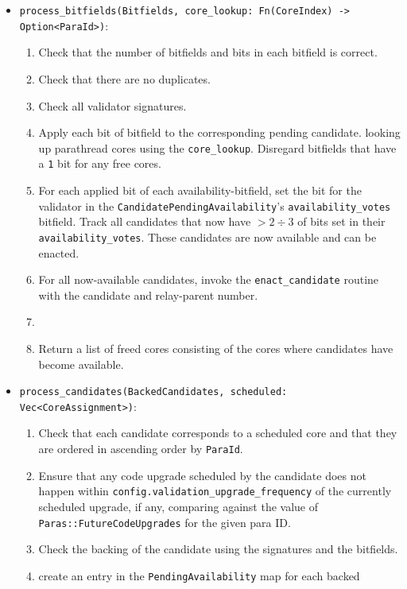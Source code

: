 \begin{itemize}
    \item \verb|process_bitfields(Bitfields, core_lookup: Fn(CoreIndex) -> Option<ParaId>)|:
    \begin{enumerate}
        \item Check that the number of bitfields and bits in each bitfield is correct.
        \item Check that there are no duplicates.
        \item Check all validator signatures.
        \item Apply each bit of bitfield to the corresponding pending candidate.
        looking up parathread cores using the \verb|core_lookup|. Disregard
        bitfields that have a \verb|1| bit for any free cores.
        \item For each applied bit of each availability-bitfield, set the bit
        for the validator in the \verb|CandidatePendingAvailability|'s
        \verb|availability_votes| bitfield. Track all candidates that now have
        $>2\div3$ of bits set in their \verb|availability_votes|. These candidates
        are now available and can be enacted.
        \item For all now-available candidates, invoke the
        \verb|enact_candidate| routine with the candidate and relay-parent
        number.
        \item {}
        \item Return a list of freed cores consisting of the cores where
        candidates have become available.
    \end{enumerate}
    \item \verb|process_candidates(BackedCandidates, scheduled: Vec<CoreAssignment>)|:
    \begin{enumerate}
        \item Check that each candidate corresponds to a scheduled core and that
        they are ordered in ascending order by \verb|ParaId|.
        \item Ensure that any code upgrade scheduled by the candidate does not
        happen within \verb|config.validation_upgrade_frequency| of the currently
        scheduled upgrade, if any, comparing against the value of
        \verb|Paras::FutureCodeUpgrades| for the given para ID.
        \item Check the backing of the candidate using the signatures and the
        bitfields.
        \item create an entry in the \verb|PendingAvailability| map for each backed

\end{enumerate}
\end{itemize}
